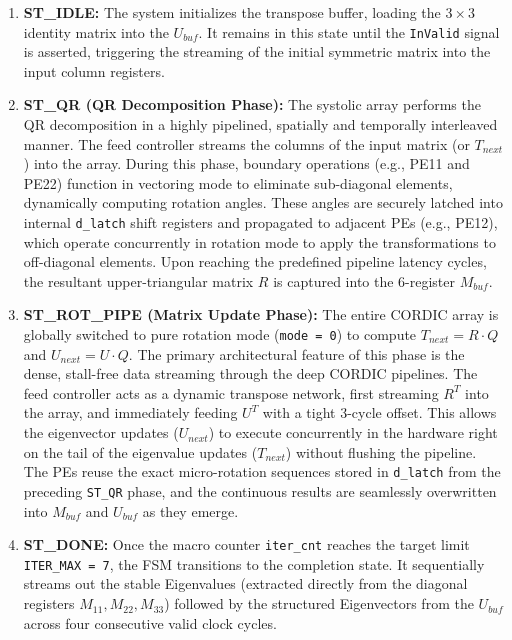 \documentclass[11pt, a4paper]{article}
\begin{document}
\begin{enumerate}
    \item \textbf{ST\_IDLE:} The system initializes the transpose buffer, loading the $3 \times 3$ identity matrix into the $U_{buf}$. It remains in this state until the \texttt{InValid} signal is asserted, triggering the streaming of the initial symmetric matrix into the input column registers.
    
    \item \textbf{ST\_QR (QR Decomposition Phase):} The systolic array performs the QR decomposition in a highly pipelined, spatially and temporally interleaved manner. The feed controller streams the columns of the input matrix (or $T_{next}$) into the array. During this phase, boundary operations (e.g., PE11 and PE22) function in vectoring mode to eliminate sub-diagonal elements, dynamically computing rotation angles. These angles are securely latched into internal \texttt{d_latch} shift registers and propagated to adjacent PEs (e.g., PE12), which operate concurrently in rotation mode to apply the transformations to off-diagonal elements. Upon reaching the predefined pipeline latency cycles, the resultant upper-triangular matrix $R$ is captured into the 6-register $M_{buf}$.
    
    \item \textbf{ST\_ROT\_PIPE (Matrix Update Phase):} The entire CORDIC array is globally switched to pure rotation mode (\texttt{mode = 0}) to compute $T_{next} = R \cdot Q$ and $U_{next} = U \cdot Q$. The primary architectural feature of this phase is the dense, stall-free data streaming through the deep CORDIC pipelines. The feed controller acts as a dynamic transpose network, first streaming $R^T$ into the array, and immediately feeding $U^T$ with a tight 3-cycle offset. This allows the eigenvector updates ($U_{next}$) to execute concurrently in the hardware right on the tail of the eigenvalue updates ($T_{next}$) without flushing the pipeline. The PEs reuse the exact micro-rotation sequences stored in \texttt{d_latch} from the preceding \texttt{ST_QR} phase, and the continuous results are seamlessly overwritten into $M_{buf}$ and $U_{buf}$ as they emerge.
    
    \item \textbf{ST\_DONE:} Once the macro counter \texttt{iter_cnt} reaches the target limit \texttt{ITER_MAX = 7}, the FSM transitions to the completion state. It sequentially streams out the stable Eigenvalues (extracted directly from the diagonal registers $M_{11}, M_{22}, M_{33}$) followed by the structured Eigenvectors from the $U_{buf}$ across four consecutive valid clock cycles.
\end{enumerate}
\end{document}
